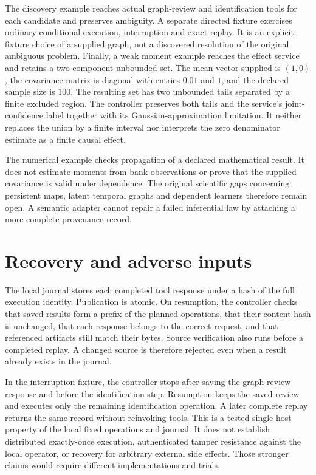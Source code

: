 The discovery example reaches actual graph-review and identification tools for
each candidate and preserves ambiguity. A separate directed fixture exercises
ordinary conditional execution, interruption and exact replay. It is an explicit
fixture choice of a supplied graph, not a discovered resolution of the original
ambiguous problem. Finally, a weak moment example reaches the effect service
and retains a two-component unbounded set. The mean vector supplied is $(1,0)$,
the covariance matrix is diagonal with entries $0.01$ and $1$, and the declared
sample size is $100$. The resulting set has two unbounded tails separated by a
finite excluded region. The controller preserves both tails and the service's
joint-confidence label together with its Gaussian-approximation limitation.
It neither replaces the union by a finite interval nor interprets the zero
denominator estimate as a finite causal effect.

The numerical example checks propagation of a declared mathematical result.
It does not estimate moments from bank observations or prove that the supplied
covariance is valid under dependence. The original scientific gaps concerning
persistent maps, latent temporal graphs and dependent learners therefore remain
open. A semantic adapter cannot repair a failed inferential law by attaching a
more complete provenance record.

\section{Recovery and adverse inputs}

The local journal stores each completed tool response under a hash of the full
execution identity. Publication is atomic. On resumption, the controller
checks that saved results form a prefix of the planned operations, that their
content hash is unchanged, that each response belongs to the correct request,
and that referenced artifacts still match their bytes. Source verification also
runs before a completed replay. A changed source is therefore rejected even
when a result already exists in the journal.

In the interruption fixture, the controller stops after saving the graph-review
response and before the identification step. Resumption keeps the saved review
and executes only the remaining identification operation. A later complete
replay returns the same record without reinvoking tools. This is a tested
single-host property of the local fixed operations and journal. It does not
establish distributed exactly-once execution, authenticated tamper resistance
against the local operator, or recovery for arbitrary external side effects.
Those stronger claims would require different implementations and trials.

